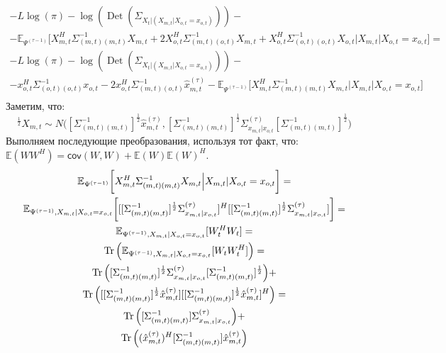 \documentclass[11pt]{article}
\newcommand{\Expect}{\mathbb{E}}
\newcommand{\Cov}{\mathsf{cov}}
\DeclareMathOperator{\Det}{Det}
\begin{document}
\begin{equation*}
\begin{gathered}
-L \log(\pi) - \log (\Det(\Sigma_{X_t|(X_{m,t}|X_{o,t}=x_{o,t})}))  - \\ 
- \Expect_{\Psi^{(\tau-1)}}\bigg[X_{m,t}^H \Sigma_{(m,t)(m,t)}^{-1}X_{m,t} + 2 X_{o,t}^H \Sigma_{(m,t)(o,t)}^{-1}X_{m,t}  + X_{o,t}^H \Sigma_{(o,t)(o,t)}^{-1}X_{o,t}\Big|X_{m,t}|X_{o,t}=x_{o,t}\bigg] = \\
-L \log(\pi) - \log (\Det(\Sigma_{X_t|(X_{m,t}|X_{o,t}=x_{o,t})}))  - \\ 
- x_{o,t}^H \Sigma_{(o,t)(o,t)}^{-1}x_{o,t} - 2 x_{o,t}^H \Sigma_{(m,t)(o,t)}^{-1}\hat{x}_{m,t}^{(\tau)} - \Expect_{\Psi^{(\tau-1)}}\bigg[X_{m,t}^H \Sigma_{(m,t)(m,t)}^{-1}X_{m,t}   \Big|X_{m,t}|X_{o,t}=x_{o,t}\bigg] \\
\end{gathered}
\end{equation*}
Заметим, что: 
\begin{equation*}
[\Sigma_{(m,t)(m,t)}^{-1}]^{\frac{1}{2}}X_{m,t} \sim N\Big([\Sigma_{(m,t)(m,t)}^{-1}]^{\frac{1}{2}}\hat{x}_{m,t}^{(\tau)},[\Sigma_{(m,t)(m,t)}^{-1}]^{\frac{1}{2}}\Sigma^{(\tau)}_{x_{m,t}|x_{o,t}}[\Sigma_{(m,t)(m,t)}^{-1}]^{\frac{1}{2}}\Big)
\end{equation*}
Выполняем последующие преобразования, используя тот факт, что: $\Expect(WW^H)=\Cov(W,W)+\Expect(W)\Expect(W)^H$.
\begin{equation*}
\begin{gathered}
\Expect_{\Psi^{(\tau-1)}}\bigg[X_{m,t}^H \Sigma_{(m,t)(m,t)}^{-1}X_{m,t}   \Big|X_{m,t}|X_{o,t}=x_{o,t}\bigg] = \\
\Expect_{\Psi^{(\tau-1)},X_{m,t}|X_{o,t}=x_{o,t}}\bigg[[[\Sigma_{(m,t)(m,t)}^{-1}]^{\frac{1}{2}}\Sigma^{(\tau)}_{x_{m,t}|x_{o,t}}]^H[[\Sigma_{(m,t)(m,t)}^{-1}]^{\frac{1}{2}}\Sigma^{(\tau)}_{x_{m,t}|x_{o,t}}]\bigg] = \\
\Expect_{\Psi^{(\tau-1)},X_{m,t}|X_{o,t}=x_{o,t}}[W_t^HW_t] = \\
\Tr \Big( \Expect_{\Psi^{(\tau-1)},X_{m,t}|X_{o,t}=x_{o,t}}[W_tW_t^H] \Big) = \\
\Tr \Big( [\Sigma_{(m,t)(m,t)}^{-1}]^{\frac{1}{2}}\Sigma^{(\tau)}_{x_{m,t}|x_{o,t}}[\Sigma_{(m,t)(m,t)}^{-1}]^{\frac{1}{2}} \Big) + \\ \Tr \Big( [[\Sigma_{(m,t)(m,t)}^{-1}]^{\frac{1}{2}}\hat{x}_{m,t}^{(\tau)}][[\Sigma_{(m,t)(m,t)}^{-1}]^{\frac{1}{2}}\hat{x}_{m,t}^{(\tau)}]^H \Big)= \\
\Tr \Big( [\Sigma_{(m,t)(m,t)}^{-1}]\Sigma^{(\tau)}_{x_{m,t}|x_{o,t}} \Big) + \\ \Tr \Big((\hat{x}_{m,t}^{(\tau)})^H[\Sigma_{(m,t)(m,t)}^{-1}]\hat{x}_{m,t}^{(\tau)} \Big) \\
\end{gathered}
\end{equation*}
\end{document}

